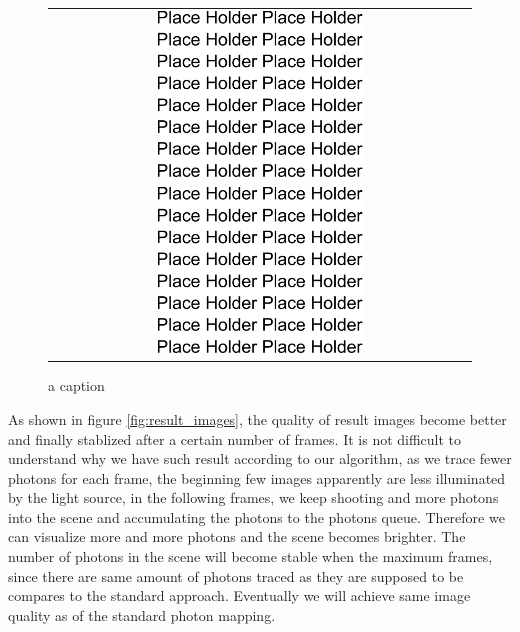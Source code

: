 \begin{figure}
\begin{center}
{\begin{tabular}{c}
\includegraphics*[width=0.5\textwidth]{imgs/place_holder.pdf}\\
\includegraphics*[width=0.5\textwidth]{imgs/place_holder.pdf}
\end{tabular}
}%

\caption{a caption}
\end{center}
\end{figure}

As shown in figure \ref{fig:result_images}, the quality of 	result images become better and finally stablized after a certain number of frames. It is not difficult to understand why we have such result according to our algorithm, as we trace fewer photons for each frame, the beginning few images apparently are less illuminated by the light source, in the following frames, we keep shooting and more photons into the scene and accumulating the photons to the photons queue. Therefore we can visualize more and more photons and the scene becomes brighter. The number of photons in the scene will become stable when the maximum frames, since there are same amount of photons traced as they are supposed to be compares to the standard approach. Eventually we will achieve same image quality as of the standard photon mapping. 


